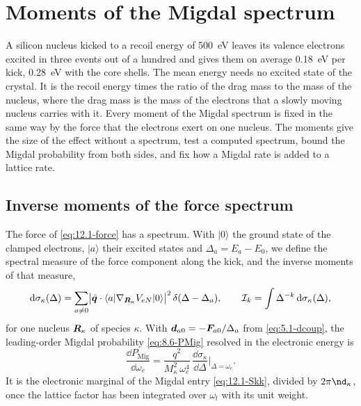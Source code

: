 \section{Moments of the Migdal spectrum}\label{sec:12.5}

A silicon nucleus kicked to a recoil energy of \SI{500}{eV} leaves its valence electrons excited in three events out of a hundred and gives them on average \SI{0.18}{eV} per kick, \SI{0.28}{eV} with the core shells. The mean energy needs no excited state of the crystal. It is the recoil energy times the ratio of the drag mass to the mass of the nucleus, where the drag mass is the mass of the electrons that a slowly moving nucleus carries with it. Every moment of the Migdal spectrum is fixed in the same way by the force that the electrons exert on one nucleus. The moments give the size of the effect without a spectrum, test a computed spectrum, bound the Migdal probability from both sides, and fix how a Migdal rate is added to a lattice rate.

\subsection{Inverse moments of the force spectrum}\label{sec:12.5-moments}

The force of \cref{eq:12.1-force} has a spectrum. With $|0\rangle$ the ground state of the clamped electrons, $|a\rangle$ their excited states and $\Delta_a = E_a - E_0$, we define the spectral measure of the force component along the kick, and the inverse moments of that measure,
\begin{equation}
  \mathrm{d}\sigma_\kappa(\Delta) = \sum_{a\neq0}\bigl|\hat{\bm{q}}\cdot\langle a|\nabla_{\bm{R}_\kappa}V_{eN}|0\rangle\bigr|^2\,\delta(\Delta - \Delta_a) , \qquad
  \mathcal{I}_k = \int\Delta^{-k}\,\mathrm{d}\sigma_\kappa(\Delta) ,
  \label{eq:12.5-sigma}
\end{equation}
for one nucleus $\bm{R}_\kappa$ of species $\kappa$. With $\bm{d}_{a0} = -\bm{F}_{a0}/\Delta_a$ from \cref{eq:5.1-dcoup}, the leading-order Migdal probability \cref{eq:8.6-PMig} resolved in the electronic energy is
\begin{equation}
  \frac{\dd P_{\mathrm{Mig}}}{\dd\omega_e} = \frac{q^2}{M_\kappa^2\,\omega_e^4}\,\frac{\dd\sigma_\kappa}{\dd\Delta}\bigg|_{\Delta = \omega_e} .
  \label{eq:12.5-spectrum}
\end{equation}
It is the electronic marginal of the Migdal entry \cref{eq:12.1-Skk}, divided by $2\pi\nd_\kappa$, once the lattice factor has been integrated over $\omega_l$ with its unit weight.


